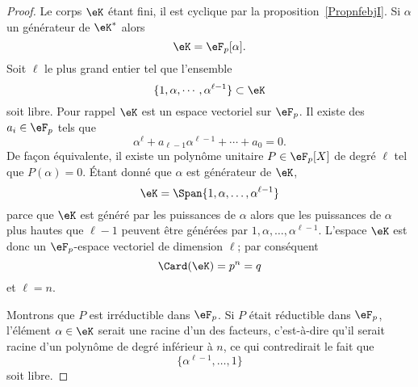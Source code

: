 \begin{proof}
	Le corps \( \eK\) étant fini, il est cyclique par la proposition~\ref{PropnfebjI}. Si \( \alpha\) un générateur de \( \eK^*\) alors
	\begin{equation}
		\eK=\eF_p[\alpha].
	\end{equation}
	Soit \( \ell\) le plus grand entier tel que l'ensemble
	\begin{equation}
		\{ 1,\alpha,\cdots,\alpha^{\ell-1} \}\subset\eK
	\end{equation}
	soit libre. Pour rappel \( \eK\) est un espace vectoriel sur \( \eF_p\). Il existe des \( a_i\in \eF_p\) tels que
	\begin{equation}
		\alpha^{\ell}+a_{\ell-1}\alpha^{\ell-1}+\cdots+a_0=0.
	\end{equation}
	De façon équivalente, il existe un polynôme unitaire \( P\in\eF_p[X]\) de degré \( \ell\) tel que \( P(\alpha)=0\). Étant donné que \( \alpha\) est générateur de \( \eK\),
	\begin{equation}
		\eK=\Span\{ 1,\alpha,\ldots, \alpha^{\ell-1} \}
	\end{equation}
	parce que \( \eK\) est généré par les puissances de \( \alpha\) alors que les puissances de \( \alpha\) plus hautes que \( \ell-1\) peuvent être générées par \( 1,\alpha,\ldots, \alpha^{\ell-1}\). L'espace \( \eK\) est donc un \( \eF_p\)-espace vectoriel de dimension \( \ell\); par conséquent
	\begin{equation}
		\Card(\eK)=p^n=q
	\end{equation}
	et \( \ell=n\).

	Montrons que \( P\) est irréductible dans \( \eF_p\). Si \( P\) était réductible dans \( \eF_p\), l'élément \( \alpha\in \eK\) serait une racine d'un des facteurs, c'est-à-dire qu'il serait racine d'un polynôme de degré inférieur à \( n\), ce qui contredirait le fait que
	\begin{equation}
		\{ \alpha^{\ell-1},\ldots, 1 \}
	\end{equation}
	soit libre.


\end{proof}
